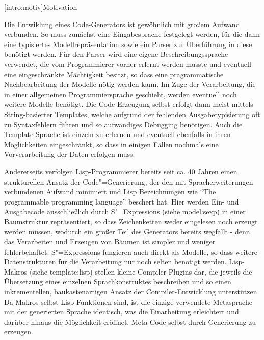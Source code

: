 \documentclass[11pt, a4paper, bibgerm]{book}
\newcommand\lsection{}
\newcommand\sref{}
\newcommand{\sees}[1]{(siehe \sref{#1})}
\newcommand{\sexps}{S"=Expressions}
\newcommand{\cgen}{Code"=Generierung}
\begin{document}
\lsection[intro:motiv]{Motivation}

Die Entwiklung eines Code-Generators ist gewöhnlich mit großem Aufwand
verbunden. So muss zunächst eine Eingabesprache festgelegt werden, für
die dann eine typisiertes Modellrepräsentation sowie ein Parser zur
Überführung in diese benötigt werden. Für den Parser wird eine eigene
Beschreibungssprache verwendet, die vom Programmierer vorher erlernt
werden musste und eventuell eine eingeschränkte Mächtigkeit besitzt, so
dass eine pragrammatische Nachbearbeitung der Modelle nötig werden
kann. Im Zuge der Verarbeitung, die in einer allgemeinen
Programmiersprache geschieht, werden eventuell noch weitere Modelle
benötigt. Die Code-Erzeugung selbst erfolgt dann meist mittels
String-basierter Templates, welche aufgrund der fehlenden
Ausgabetypisierung oft zu Syntaxfehlern führen und so aufwändiges
Debugging benötigen. Auch die Template-Sprache ist einzeln zu erlernen
und eventuell ebenfalls in ihren Möglichkeiten eingeschränkt, so dass in
einigen Fällen nochmals eine Vorverarbeitung der Daten erfolgen muss.

Andererseits verfolgen Lisp-Programmierer bereits seit ca. 40 Jahren
einen strukturellen Ansatz der \cgen{}, der den mit Spracherweiterungen
verbundenen Aufwand minimiert und Lisp Bezeichnungen wie "`The
programmable programming language"'\cite{federano} beschert hat. Hier
werden Ein- und Ausgabecode ausschließlich durch \sexps{}
\sees{model:sexp} in einer Baumstruktur repräsentiert, so dass
Zeichenketten weder eingelesen noch erzeugt werden müssen, wodurch ein
großer Teil des Generators bereits wegfällt - denn das Verarbeiten und
Erzeugen von Bäumen ist simpler und weniger fehlerbehaftet. \sexps{}
fungieren auch direkt als Modelle, so dass weitere Datenstrukturen für
die Verarbeitung nur noch selten benötigt werden. Lisp-Makros
\sees{template:lisp} stellen kleine Compiler-Plugins dar, die jeweils
die Übersetzung eines einzelnen Sprachkonstruktes beschreiben und so
einen inkrementellen, baukastenartigen Ansatz der Compiler-Entwicklung
unterstützen. Da Makros selbst Lisp-Funktionen sind, ist die einzige
verwendete Metasprache mit der generierten Sprache identisch, was die
Einarbeitung erleichtert und darüber hinaus die Möglichkeit eröffnet,
Meta-Code selbst durch Generierung zu erzeugen.
\end{document}
